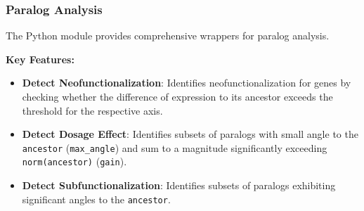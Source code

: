 \subsubsection{Paralog Analysis}
The Python module provides comprehensive wrappers for paralog analysis.

\textbf{Key Features:}
\begin{itemize}
    \item \textbf{Detect Neofunctionalization}: Identifies neofunctionalization for genes by checking whether the difference of expression to its ancestor exceeds the threshold for the respective axis.
    \item \textbf{Detect Dosage Effect}: Identifies subsets of paralogs with small angle to the \lstinline!ancestor! (\lstinline!max_angle!) and sum to a magnitude significantly exceeding \lstinline!norm(ancestor)! (\lstinline!gain!).
    \item \textbf{Detect Subfunctionalization}: Identifies subsets of paralogs exhibiting significant angles to the \lstinline!ancestor!.
\end{itemize}

